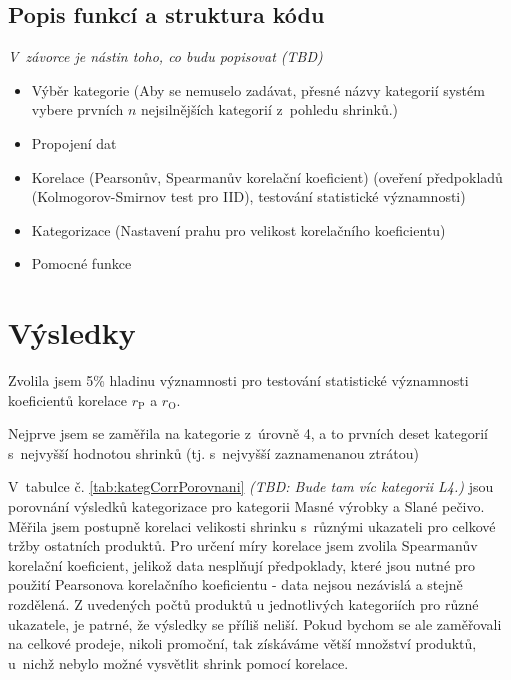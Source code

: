 \subsection{Popis funkcí a struktura kódu}

\emph{V~závorce je nástin toho, co budu popisovat (TBD)}

\begin{itemize}
    \item Výběr kategorie (Aby se nemuselo zadávat, přesné názvy kategorií systém vybere prvních $n$ nejsilnějších kategorií z~pohledu shrinků.)
    \item Propojení dat
    \item Korelace (Pearsonův, Spearmanův korelační koeficient) (oveření předpokladů (Kolmogorov-Smirnov test pro IID), testování statistické významnosti)
    \item Kategorizace (Nastavení prahu pro velikost korelačního koeficientu)
    \item Pomocné funkce
\end{itemize}

\section{Výsledky}
Zvolila jsem 5\% hladinu významnosti pro testování statistické významnosti koeficientů korelace $r_\mathrm{P}$ a $r_\mathrm{O}$.

Nejprve jsem se zaměřila na kategorie z~úrovně 4, a to prvních deset kategorií s~nejvyšší hodnotou shrinků (tj. s~nejvyšší zaznamenanou ztrátou) 

V~tabulce č. \ref*{tab:kategCorrPorovnani} \emph{(TBD: Bude tam víc kategorii L4.)} jsou porovnání výsledků kategorizace pro kategorii Masné výrobky a Slané pečivo. Měřila jsem postupně korelaci velikosti shrinku s~různými ukazateli pro celkové tržby ostatních produktů. Pro určení míry korelace jsem zvolila Spearmanův korelační koeficient, jelikož data nesplňují předpoklady, které jsou nutné pro použití Pearsonova korelačního koeficientu - data nejsou nezávislá a stejně rozdělená. 
Z uvedených počtů produktů u jednotlivých kategoriích pro různé ukazatele, je patrné, že výsledky se příliš neliší. Pokud bychom se ale zaměřovali na celkové prodeje, nikoli promoční, tak získáváme větší množství produktů, u~nichž nebylo možné vysvětlit shrink pomocí korelace. 

